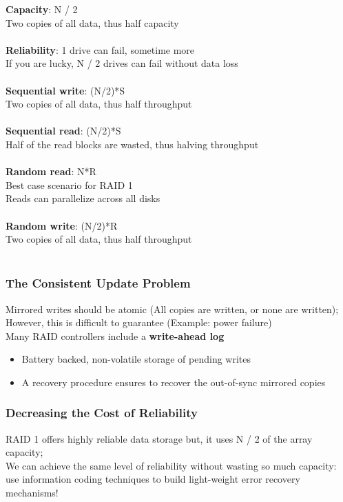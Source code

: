 \documentclass[10pt, oneside]{article}
\begin{document}
{\bf Capacity}: N / 2\\  Two copies of all data, thus half capacity\\\\
{\bf Reliability}: 1 drive can fail, sometime more\\  If you are lucky, N / 2 drives can fail without data loss\\\\
{\bf Sequential write}: (N/2)*S\\  Two copies of all data, thus half throughput\\\\
{\bf Sequential read}: (N/2)*S\\ Half of the read blocks are wasted, thus halving throughput\\\\
{\bf Random read}: N*R\\  Best case scenario for RAID 1\\ Reads can parallelize across all disks
\\\\
{\bf Random write}: (N/2)*R\\ Two copies of all data, thus half throughput\\\\
\subsubsection*{The Consistent Update Problem}Mirrored writes should be atomic (All copies are written, or none are written); However, this is difficult to guarantee (Example: power failure)\\
Many RAID controllers include a
{\bf write-ahead log}\begin{itemize}
    \item Battery backed, non-volatile storage of pending writes
    \item A recovery procedure ensures to recover the out-of-sync mirrored copies
\end{itemize}
\subsubsection*{Decreasing the Cost of Reliability}RAID 1 offers highly reliable data storage but, it uses N / 2 of the array capacity; \\We can achieve the same level of reliability without wasting so much capacity: use information coding techniques to build light-weight error recovery mechanisms!
\end{document}
